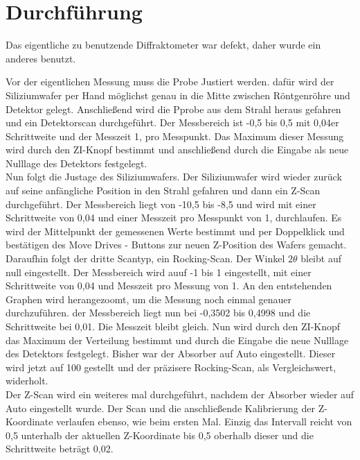 \section{Durchführung}
\label{sec:Durchführung}
Das eigentliche zu benutzende Diffraktometer war defekt, daher wurde ein anderes benutzt.

Vor der eigentlichen Messung muss die Probe Justiert werden. dafür wird der Siliziumwafer per Hand möglichst genau in die Mitte 
zwischen Röntgenröhre und Detektor gelegt. 
Anschließend wird die Pprobe aus dem Strahl heraus gefahren und ein Detektorscan durchgeführt.
Der Messbereich ist -0,5 bis 0,5 mit 0,04er Schrittweite und der Messzeit 1, pro Messpunkt. 
Das Maximum dieser Messung wird durch den \glqq ZI\grqq{}-Knopf bestimmt und anschließend durch die Eingabe als neue Nulllage des Detektors festgelegt.\\

Nun folgt die Justage des Siliziumwafers.
Der Siliziumwafer wird wieder zurück auf seine anfängliche Position in den Strahl gefahren und dann ein Z-Scan durchgeführt.
Der Messbereich liegt von -10,5 bis -8,5 und wird mit einer Schrittweite von 0,04 und einer Messzeit pro Messpunkt von 1, durchlaufen.
Es wird der Mittelpunkt der gemessenen Werte bestimmt und per Doppelklick und bestätigen des \glqq Move Drives\grqq{} - Buttons zur neuen Z-Position des Wafers gemacht.\\

Daraufhin folgt der dritte Scantyp, ein Rocking-Scan.
Der Winkel $2 \theta$ bleibt auf null eingestellt. Der Messbereich wird auuf -1 bis 1 eingestellt, mit einer Schrittweite von 0,04 und Messzeit pro Messung von 1.
An den entstehenden Graphen wird herangezoomt, um die Messung noch einmal genauer durchzuführen. der Messbereich liegt nun bei -0,3502 bis 0,4998 und die 
Schrittweite bei 0,01. Die Messzeit bleibt gleich. Nun wird durch den \glqq ZI\grqq{}-Knopf das Maximum der Verteilung bestimmt und durch die Eingabe die neue Nulllage des Detektors 
festgelegt.
Bisher war der Absorber auf \glqq Auto\grqq{} eingestellt. Dieser wird jetzt auf 100 gestellt und der präzisere Rocking-Scan, als Vergleichswert, widerholt.\\

Der Z-Scan wird ein weiteres mal durchgeführt, nachdem der Absorber wieder auf \glqq Auto\grqq{} eingestellt wurde.
Der Scan und die anschließende Kalibrierung der Z-Koordinate verlaufen ebenso, wie beim ersten Mal.
Einzig das Intervall reicht von 0,5 unterhalb der aktuellen Z-Koordinate bis 0,5 oberhalb dieser und die Schrittweite beträgt 0,02.\\

